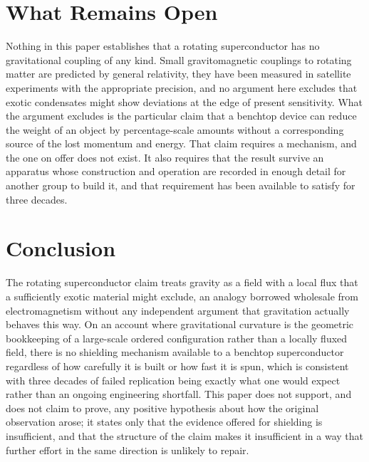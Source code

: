 \documentclass[11pt]{article}
\begin{document}
\section{What Remains Open}

Nothing in this paper establishes that a rotating superconductor has no gravitational coupling of any kind. Small gravitomagnetic couplings to rotating matter are predicted by general relativity, they have been measured in satellite experiments with the appropriate precision, and no argument here excludes that exotic condensates might show deviations at the edge of present sensitivity. What the argument excludes is the particular claim that a benchtop device can reduce the weight of an object by percentage-scale amounts without a corresponding source of the lost momentum and energy. That claim requires a mechanism, and the one on offer does not exist. It also requires that the result survive an apparatus whose construction and operation are recorded in enough detail for another group to build it, and that requirement has been available to satisfy for three decades.

\section{Conclusion}

The rotating superconductor claim treats gravity as a field with a local flux that a sufficiently exotic material might exclude, an analogy borrowed wholesale from electromagnetism without any independent argument that gravitation actually behaves this way. On an account where gravitational curvature is the geometric bookkeeping of a large-scale ordered configuration rather than a locally fluxed field, there is no shielding mechanism available to a benchtop superconductor regardless of how carefully it is built or how fast it is spun, which is consistent with three decades of failed replication being exactly what one would expect rather than an ongoing engineering shortfall. This paper does not support, and does not claim to prove, any positive hypothesis about how the original observation arose; it states only that the evidence offered for shielding is insufficient, and that the structure of the claim makes it insufficient in a way that further effort in the same direction is unlikely to repair.
\end{document}
